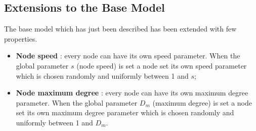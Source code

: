 \documentclass{llncs}
\begin{document}
\subsection{Extensions to the Base Model}
The base model which has just been described has been extended with few properties.\\
\begin{itemize}
	\item \textbf{Node speed} : every node can have its own speed parameter. When the global parameter $s$ (node speed) is set a node set its own speed parameter which is chosen randomly and uniformly between 1 and $s$;\\
	\item \textbf{Node maximum degree} : every node can have its own maximum degree parameter. When the global parameter $D_{m}$ (maximum degree) is set a node set its own maximum degree parameter which is chosen randomly and uniformly between 1 and $D_{m}$.
\end{itemize}
%
\end{document}
